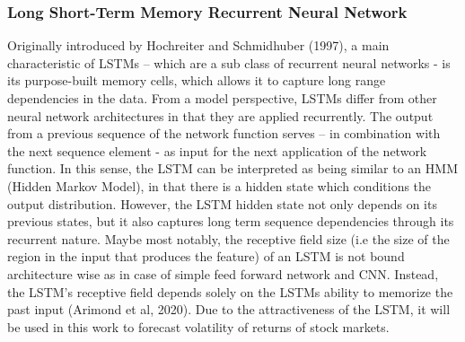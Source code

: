\documentclass[a4paper,11pt,oneside]{book}
\begin{document}
\subsubsection{Long Short-Term Memory Recurrent Neural Network}
Originally introduced by Hochreiter and Schmidhuber (1997), a main characteristic of LSTMs – which are a sub class of recurrent neural networks - is its purpose-built memory cells, which allows it to capture long range dependencies in the data. From a model perspective, LSTMs differ from other neural network architectures in that they are applied recurrently.\newline\newline
The output from a previous sequence of the network function serves – in combination with the next sequence element - as input for the next application of the network function. In this sense, the LSTM can be interpreted as being similar to an HMM (Hidden Markov Model), in that there is a hidden state which conditions the output distribution. However, the LSTM hidden state not only depends on its previous states, but it also captures long term sequence dependencies through its recurrent nature. Maybe most notably, the receptive field size (i.e the size of the region in the input that produces the feature) of an LSTM is not bound architecture wise as in case of simple feed forward network and CNN. Instead, the LSTM’s receptive field depends solely on the LSTMs ability to memorize the past input (Arimond et al, 2020). \newline\newline Due to the attractiveness of the LSTM, it will be used in this work to forecast volatility of returns of stock markets. \newline\newline
\end{document}

